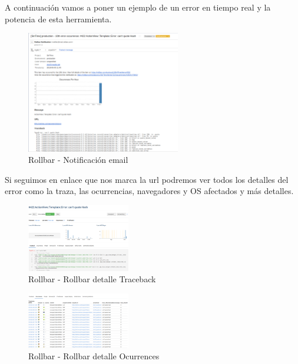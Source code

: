 A continuación vamos a poner un ejemplo de un error en tiempo real y la potencia de esta herramienta.

\begin{figure}[ht]
	\centering
	\includegraphics[width=0.6\textwidth]{imagenes/tecnologias/rollbar_error_mail.png}
	\caption{Rollbar - Notificación email}
	\label{rollbar_error_mail}
\end{figure}

\newpage

Si seguimos en enlace que nos marca la url podremos ver todos los detalles del error como la traza, las ocurrencias, navegadores y OS afectados y más detalles.\\


\begin{figure}[ht]
	\centering
	\includegraphics[width=0.4\textwidth]{imagenes/tecnologias/rollbar_error_traceback.png}
	\caption{Rollbar - Rollbar detalle Traceback}
	\label{rollbar_error_traceback}
\end{figure}

\begin{figure}[ht]
	\centering
	\includegraphics[width=0.4\textwidth]{imagenes/tecnologias/rollbar_error_ocurrences.png}
	\caption{Rollbar - Rollbar detalle Ocurrences}
	\label{rollbar_error_ocurrences}
\end{figure}

